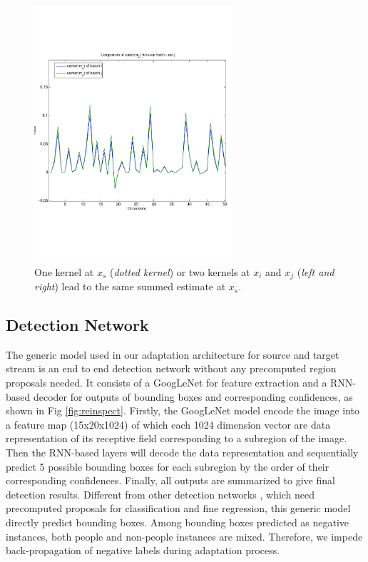 \documentclass[runningheads]{llncs}
\begin{document}
\begin{figure}
\centering
\includegraphics[height=9.5cm]{images/mmd2.pdf}
\caption{One kernel at $x_s$ ({\it dotted kernel}) or two kernels at
$x_i$ and $x_j$ ({\it left and right}) lead to the same summed estimate
at $x_s$. }
\label{fig:example}
\end{figure}



\subsection{Detection Network}
\label{section:Detection Network}
The generic model \cite{stewart2015end} used in our adaptation architecture for source and target stream is an end to end detection network without any precomputed region proposals needed. It consists of a GoogLeNet \cite{szegedy2015going} for feature extraction and a RNN-based decoder for outputs of bounding boxes and corresponding confidences, as shown in Fig \ref{fig:reinspect}. Firstly, the GoogLeNet model encode the image into a feature map (15x20x1024) of which each 1024 dimension vector are data representation of its receptive field corresponding to a subregion of the image. Then the RNN-based layers will decode the data representation and sequentially predict 5 possible bounding boxes for each subregion by the order of their corresponding confidences. Finally, all outputs are summarized to give final detection results. Different from other detection networks \cite{girshick2015fast,vu2015context}, which need precomputed proposals for classification and fine regression, this generic model directly predict bounding boxes. Among bounding boxes predicted as negative instances, both people and non-people instances are mixed. Therefore, we impede back-propagation of negative labels during adaptation process.
\end{document}
